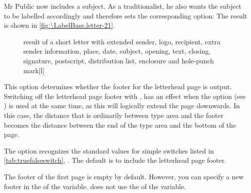 \begin{Example}
  Mr Public now includes a subject. As a traditionalist, he also wants the
  subject to be labelled accordingly and therefore sets the corresponding
  option:%
  The result is shown in \autoref{fig:\LabelBase.letter-21}.
  \begin{figure}
    \setcapindent{0pt}%
    \begin{captionbeside}
      {result of a short letter with extended sender, logo, recipient,
        extra sender information, place, date, subject, opening, text,
        closing, signature, postscript, distribution list, enclosure and
        hole-punch mark}[l]
    \end{captionbeside}
    \label{fig:\LabelBase.letter-21}
  \end{figure}
\end{Example}
%
\EndIndexGroup


\begin{Declaration}
\end{Declaration}
%
This option determines whether the footer
for the letterhead page is output. Switching off the letterhead page footer
with ,
has an effect when the  option 
(see ) is used at the same
time, as this will logically extend the page downwards. In this case, the
distance that is ordinarily between type area and the footer becomes the
distance between the end of the type area and the bottom of the page.

The option recognizes the standard values for simple switches listed in
\autoref{tab:truefalseswitch}, . The default
is to include the letterhead page footer.
\EndIndexGroup


\begin{Declaration}
\end{Declaration}%
%
The footer of the first page is empty by default.
However, you can specify a new footer
in the  of the  variable. \KOMAScript{}
does not use the  of the variable.

